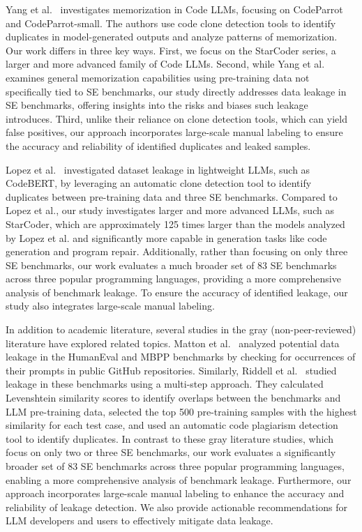 
Yang et al.~\cite{DBLP:conf/icse/0003ZWS0H024} investigates memorization in Code LLMs, focusing on CodeParrot and CodeParrot-small. The authors use code clone detection tools to identify duplicates in model-generated outputs and analyze patterns of memorization. Our work differs in three key ways. First, we focus on the StarCoder series, a larger and more advanced family of Code LLMs. Second, while Yang et al.~\cite{DBLP:conf/icse/0003ZWS0H024} examines general memorization capabilities using pre-training data not specifically tied to SE benchmarks, our study directly addresses data leakage in SE benchmarks, offering insights into the risks and biases such leakage introduces. Third, unlike their reliance on clone detection tools, which can yield false positives, our approach incorporates large-scale manual labeling to ensure the accuracy and reliability of identified duplicates and leaked samples.

Lopez et al.~\cite{lópez2024interdatasetcodeduplicationdata} investigated dataset leakage in lightweight LLMs, such as CodeBERT, by leveraging an automatic clone detection tool to identify duplicates between pre-training data and three SE benchmarks.
Compared to Lopez et al., our study investigates larger and more advanced LLMs, such as StarCoder, which are approximately 125 times larger than the models analyzed by Lopez et al. and significantly more capable in generation tasks like code generation and program repair. Additionally, rather than focusing on only three SE benchmarks, our work evaluates a much broader set of 83 SE benchmarks across three popular programming languages, providing a more comprehensive analysis of benchmark leakage. To ensure the accuracy of identified leakage, our study also integrates large-scale manual labeling.


In addition to academic literature, several studies in the gray (non-peer-reviewed) literature have explored related topics.
Matton et al.~\cite{matton2024leakagecodegenerationevaluation} analyzed potential data leakage in the HumanEval and MBPP benchmarks by checking for occurrences of their prompts in public GitHub repositories. Similarly, Riddell et al.~\cite{riddell2024quantifyingcontaminationevaluatingcode} studied leakage in these benchmarks using a multi-step approach. They calculated Levenshtein similarity scores to identify overlaps between the benchmarks and LLM pre-training data, selected the top 500 pre-training samples with the highest similarity for each test case, and used an automatic code plagiarism detection tool to identify duplicates. 
In contrast to these gray literature studies, which focus on only two or three SE benchmarks, our work evaluates a significantly broader set of 83 SE benchmarks across three popular programming languages, enabling a more comprehensive analysis of benchmark leakage. Furthermore, our approach incorporates large-scale manual labeling to enhance the accuracy and reliability of leakage detection. We also provide actionable recommendations for LLM developers and users to effectively mitigate data leakage.

